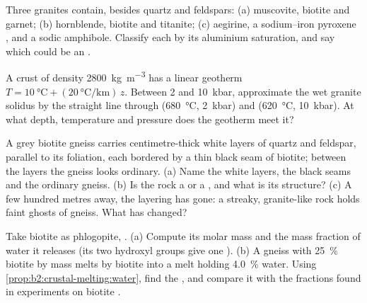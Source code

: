 \begin{exercise}[$\star$]\label{exo:b2:crustal-melting:2}
Three granites contain, besides quartz and feldspars: (a) muscovite, biotite and garnet;
(b) hornblende, biotite and titanite; (c) aegirine, a sodium--iron pyroxene
, and a sodic amphibole. Classify each by its aluminium saturation, and say
which could be an .
\end{exercise}

\begin{exercise}[$\star$]\label{exo:b2:crustal-melting:3}
A crust of density \qty{2800}{\kilogram\per\cubic\metre} has a linear geotherm
$T = \qty{10}{\celsius} + (\qty{20}{\celsius\per\kilo\metre})\,z$. Between 2 and
\qty{10}{kbar}, approximate the wet granite solidus by the straight line through
(\qty{680}{\celsius}, \qty{2}{kbar}) and (\qty{620}{\celsius}, \qty{10}{kbar}). At what
depth, temperature and pressure does the geotherm meet it?
\end{exercise}

\begin{exercise}[$\star$]\label{exo:b2:crustal-melting:4}
A grey biotite gneiss carries centimetre-thick white layers of quartz and feldspar, parallel
to its foliation, each bordered by a thin black seam of biotite; between the layers the
gneiss looks ordinary. (a) Name the white layers, the black seams and the ordinary gneiss.
(b) Is the rock a  or a , and what is its structure? (c) A few hundred
metres away, the layering has gone: a streaky, granite-like rock holds faint ghosts of
gneiss. What has changed?
\end{exercise}

\begin{exercise}[$\star\star$]\label{exo:b2:crustal-melting:5}
Take biotite as phlogopite, . (a) Compute its molar mass and the
mass fraction of water it releases (its two hydroxyl groups give one ).
(b) A gneiss with \qty{25}{\percent} biotite by mass melts by biotite 
into a melt holding \qty{4.0}{\percent} water. Using
\cref{prop:b2:crustal-melting:water}, find the , and compare it with the
fractions found in experiments on biotite .
\end{exercise}

